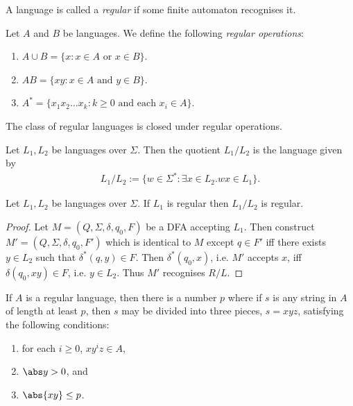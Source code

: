 \documentclass{article}
\begin{document}
\begin{definition*}
	A language is called a \emph{regular} if some finite automaton recognises it.
\end{definition*}

\begin{definition*}
	Let $A$ and $B$ be languages. We define the following \emph{regular operations}:
	\begin{enumerate}
		\item $A\cup B=\{x : x \in A \text{ or } x \in B\}$.
		\item $AB=\{xy : x \in A \text{ and } y \in B\}$.
		\item $A^* = \{x_1x_2\dots x_k:k\geq 0 \text{ and each }x_i\in A\}$.
	\end{enumerate}
\end{definition*}

\begin{theorem*}[Sipser p. 45, 60, 62]
	The class of regular languages is closed under regular operations.
\end{theorem*}

\begin{definition*}[Quotient]
	Let $L_1,L_2$ be languages over $\Sigma$. Then the quotient $L_1/L_2$ is the language
	given by
	\begin{align*}
		L_1/L_2 := \{w \in \Sigma^* : \exists x\in L_2. wx \in L_1\}.
	\end{align*}
\end{definition*}

\begin{theorem*}
	Let $L_1,L_2$ be languages over $\Sigma$. If $L_1$ is regular then $L_1/L_2$ is regular.
	\begin{proof}
		Let $M=(Q, \Sigma, \delta, q_0, F)$ be a DFA accepting $L_1$. Then construct $M'=(Q,\Sigma,\delta,q_0,F')$
		which is identical to $M$ except $q\in F'$ iff there exists $y\in L_2$ such that
		$\delta^*(q, y)\in F$.
		Then $\delta^*(q_0, x)$, i.e. $M'$ accepts $x$, iff $\delta(q_0,xy)\in F$, i.e.
		$y\in L_2$. Thus $M'$ recognises $R/L$.
	\end{proof}
\end{theorem*}

\begin{theorem*}
	If $A$ is a regular language, then there is a number $p$ where if $s$
	is any string in $A$ of length at least $p$, then $s$ may be divided
	into three pieces, $s=xyz$, satisfying the following conditions:
	\begin{enumerate}
		\item for each $i\geq 0$, $xy^iz\in A$,
		\item $\abs y > 0$, and
		\item $\abs{xy} \leq p$.
	\end{enumerate}
\end{theorem*}
\end{document}
